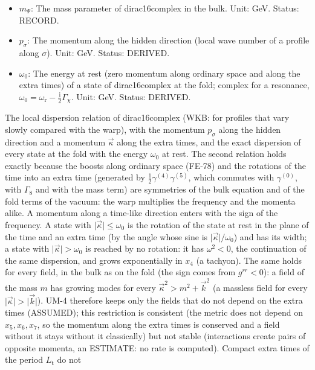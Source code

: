 \documentclass[
  10pt,
]{article}
\begin{document}
\begin{itemize}
  DERIVED.
\item
  \(m_\Psi\): The mass parameter of dirac16complex in the bulk. Unit:
  GeV. Status: RECORD.
\item
  \(p_\sigma\): The momentum along the hidden direction (local wave
  number of a profile along \(\sigma\)). Unit: GeV. Status: DERIVED.
\item
  \(\omega_0\): The energy at rest (zero momentum along ordinary space
  and along the extra times) of a state of dirac16complex at the fold;
  complex for a resonance,
  \(\omega_0 = \omega_{\mathrm{r}} - \frac{\mathrm{i}}{2}\Gamma_\chi\).
  Unit: GeV. Status: DERIVED.
\end{itemize}

The local dispersion relation of dirac16complex (WKB: for profiles that
vary slowly compared with the warp), with the momentum \(p_\sigma\)
along the hidden direction and a momentum \(\vec\kappa\) along the extra
times, and the exact dispersion of every state at the fold with the
energy \(\omega_0\) at rest. The second relation holds exactly because
the boosts along ordinary space (FE-78) and the rotations of the time
into an extra time (generated by \(\frac12\gamma^{(4)}\gamma^{(5)}\),
which commutes with \(\gamma^{(0)}\), with \(\Gamma_8\) and with the
mass term) are symmetries of the bulk equation and of the fold terms of
the vacuum: the warp multiplies the frequency and the momenta alike. A
momentum along a time-like direction enters with the sign of the
frequency. A state with \(\lvert\vec\kappa\rvert \le \omega_0\) is the
rotation of the state at rest in the plane of the time and an extra time
(by the angle whose sine is \(\lvert\vec\kappa\rvert/\omega_0\)) and has
its width; a state with \(\lvert\vec\kappa\rvert > \omega_0\) is reached
by no rotation: it has \(\omega^2 < 0\), the continuation of the same
dispersion, and grows exponentially in \(x_4\) (a tachyon). The same
holds for every field, in the bulk as on the fold (the sign comes from
\(g^{rr} < 0\)): a field of the mass \(m\) has growing modes for every
\(\vec\kappa^2 > m^2 + \vec k^2\) (a massless field for every
\(\lvert\vec\kappa\rvert > \lvert\vec k\rvert\)). UM-4 therefore keeps
only the fields that do not depend on the extra times (ASSUMED); this
restriction is consistent (the metric does not depend on
\(x_5, x_6, x_7\), so the momentum along the extra times is conserved
and a field without it stays without it classically) but not stable
(interactions create pairs of opposite momenta, an ESTIMATE: no rate is
computed). Compact extra times of the period \(L_{\mathrm{t}}\) do not
\end{document}
